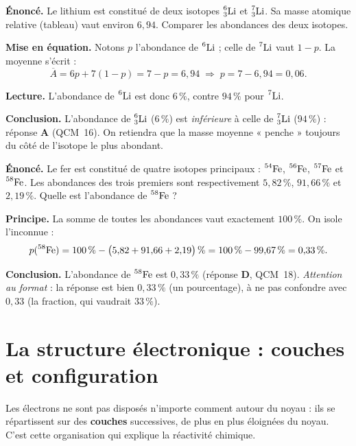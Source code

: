 \documentclass[11pt,a4paper]{article}
\newcommand{\nuc}[3]{\prescript{#1}{#2}{\mathrm{#3}}}  %
\begin{document}
\begin{exemple}
\textbf{Énoncé.} Le lithium est constitué de deux isotopes $\nuc{6}{3}{Li}$ et $\nuc{7}{3}{Li}$. Sa
masse atomique relative (tableau) vaut environ $6{,}94$. Comparer les abondances des deux isotopes.

\smallskip
\textbf{Mise en équation.} Notons $p$ l'abondance de $\nuc{6}{}{Li}$ ; celle de $\nuc{7}{}{Li}$ vaut
$1 - p$. La moyenne s'écrit :
\[ \overline{A} = 6p + 7(1-p) = 7 - p = 6{,}94 \;\Longrightarrow\; p = 7 - 6{,}94 = 0{,}06. \]

\textbf{Lecture.} L'abondance de $\nuc{6}{}{Li}$ est donc $6\,\%$, contre $94\,\%$ pour $\nuc{7}{}{Li}$.

\smallskip
\textbf{Conclusion.} L'abondance de $\nuc{6}{3}{Li}$ ($6\,\%$) est \emph{inférieure} à celle de
$\nuc{7}{3}{Li}$ ($94\,\%$) : réponse \textbf{A} (QCM~16). On retiendra que la masse moyenne « penche »
toujours du côté de l'isotope le plus abondant.
\end{exemple}

\begin{exemple}
\textbf{Énoncé.} Le fer est constitué de quatre isotopes principaux : $\nuc{54}{}{Fe}$, $\nuc{56}{}{Fe}$,
$\nuc{57}{}{Fe}$ et $\nuc{58}{}{Fe}$. Les abondances des trois premiers sont respectivement $5{,}82\,\%$,
$91{,}66\,\%$ et $2{,}19\,\%$. Quelle est l'abondance de $\nuc{58}{}{Fe}$ ?

\smallskip
\textbf{Principe.} La somme de toutes les abondances vaut exactement $100\,\%$. On isole l'inconnue :
\[ p(\nuc{58}{}{Fe}) = 100\,\% - \big(5{,}82 + 91{,}66 + 2{,}19\big)\,\% = 100\,\% - 99{,}67\,\% = 0{,}33\,\%. \]

\textbf{Conclusion.} L'abondance de $\nuc{58}{}{Fe}$ est $0{,}33\,\%$ (réponse \textbf{D}, QCM~18).
\emph{Attention au format} : la réponse est bien $0{,}33\,\%$ (un pourcentage), à ne pas confondre avec
$0{,}33$ (la fraction, qui vaudrait $33\,\%$).
\end{exemple}

\section{La structure électronique : couches et configuration}
Les électrons ne sont pas disposés n'importe comment autour du noyau : ils se répartissent sur des
\textbf{couches} successives, de plus en plus éloignées du noyau. C'est cette organisation qui explique
la réactivité chimique.
\end{document}
